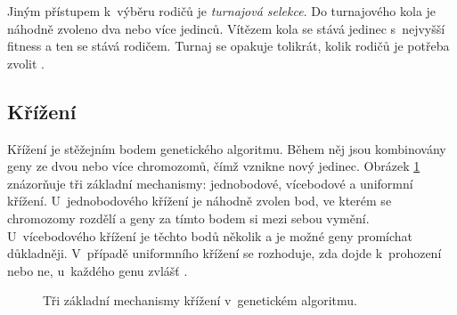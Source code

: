 Jiným přístupem k~výběru rodičů je \emph{turnajová selekce}. Do turnajového kola je náhodně zvoleno dva nebo více jedinců. Vítězem kola se stává jedinec s~nejvyšší fitness a ten se stává rodičem. Turnaj se opakuje tolikrát, kolik rodičů je potřeba zvolit \cite{Modra}.


\subsection{Křížení}

Křížení je stěžejním bodem genetického algoritmu. Během něj jsou kombinovány geny ze dvou nebo více chromozomů, čímž vznikne nový jedinec. Obrázek \ref{obrKrizeni} znázorňuje tři základní mechanismy: jednobodové, vícebodové a uniformní křížení. U~jednobodového křížení je náhodně zvolen bod, ve kterém se chromozomy rozdělí a geny za tímto bodem si mezi sebou vymění. U~vícebodového křížení je těchto bodů několik a je možné geny promíchat důkladněji. V~případě uniformního křížení se rozhoduje, zda dojde k~prohození nebo ne, u~každého genu zvlášť \cite{Modra}.

\begin{figure}[htb]
    \centering
    \caption{Tři základní mechanismy křížení v~genetickém algoritmu.}
    \label{obrKrizeni}
\end{figure}


